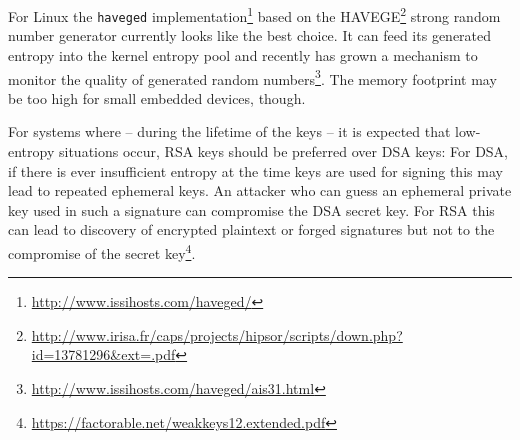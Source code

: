 For Linux the \verb+haveged+
implementation\footnote{\url{http://www.issihosts.com/haveged/}} based on the
HAVEGE\footnote{\url{http://www.irisa.fr/caps/projects/hipsor/scripts/down.php?id=13781296\&ext=.pdf}}
strong random number generator currently looks like the best choice. It
can feed its generated entropy into the kernel entropy pool and recently
has grown a mechanism to monitor the quality of generated random
numbers\footnote{\url{http://www.issihosts.com/haveged/ais31.html}}. The
memory footprint may be too high for small embedded devices, though.

For systems where -- during the lifetime of the keys -- it is expected
that low-entropy situations occur, RSA keys should be preferred over DSA
keys: For DSA, if there is ever insufficient entropy at the time keys
are used for signing this may lead to repeated ephemeral keys. An
attacker who can guess an ephemeral private key used in such a signature
can compromise the DSA secret key.
For RSA this can lead to discovery of encrypted plaintext or forged
signatures but not to the compromise of the secret
key\footnote{\url{https://factorable.net/weakkeys12.extended.pdf}}.
